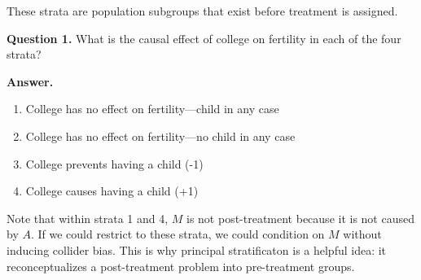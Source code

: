\documentclass[10pt]{article}
\begin{document}
These strata are population subgroups that exist before treatment is assigned.

\textbf{Question 1.} What is the causal effect of college on fertility in each of the four strata?

\textbf{Answer.}
\begin{enumerate}
\item College has no effect on fertility---child in any case
\item College has no effect on fertility---no child in any case
\item College prevents having a child (-1)
\item College causes having a child (+1)
\end{enumerate} %

Note that within strata 1 and 4, $M$ is not post-treatment because it is not caused by $A$. If we could restrict to these strata, we could condition on $M$ without inducing collider bias. This is why principal stratificaton is a helpful idea: it reconceptualizes a post-treatment problem into pre-treatment groups.
\end{document}
